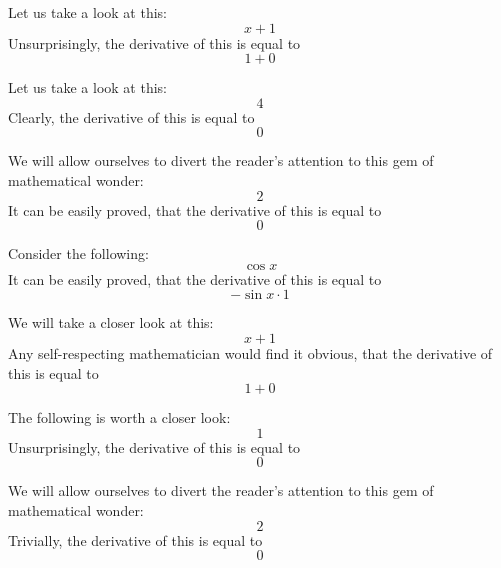 \documentclass{article}
\begin{document}
Let us take a look at this:
\begin{equation}
x + 1 
\end{equation}
Unsurprisingly, the derivative of this is equal to
\begin{equation}
1 + 0 
\end{equation}

Let us take a look at this:
\begin{equation}
4 
\end{equation}
Clearly, the derivative of this is equal to
\begin{equation}
0 
\end{equation}

We will allow ourselves to divert the reader's attention to this gem of mathematical wonder:
\begin{equation}
2 
\end{equation}
It can be easily proved, that the derivative of this is equal to
\begin{equation}
0 
\end{equation}

Consider the following:
\begin{equation}
\cos x 
\end{equation}
It can be easily proved, that the derivative of this is equal to
\begin{equation}
-\sin x \cdot 1 
\end{equation}

We will take a closer look at this:
\begin{equation}
x + 1 
\end{equation}
Any self-respecting mathematician would find it obvious, that the derivative of this is equal to
\begin{equation}
1 + 0 
\end{equation}

The following is worth a closer look:
\begin{equation}
1 
\end{equation}
Unsurprisingly, the derivative of this is equal to
\begin{equation}
0 
\end{equation}

We will allow ourselves to divert the reader's attention to this gem of mathematical wonder:
\begin{equation}
2 
\end{equation}
Trivially, the derivative of this is equal to
\begin{equation}
0 
\end{equation}
\end{document}
